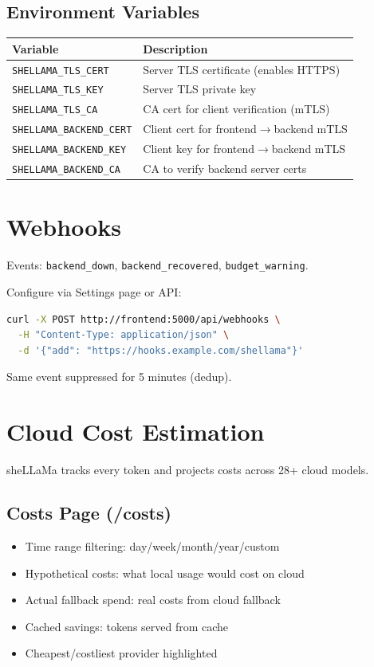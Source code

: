 \documentclass[11pt,a4paper]{article}
\begin{document}
\subsection{Environment Variables}
\begin{longtable}{p{5cm}p{8.5cm}}
\toprule
\textbf{Variable} & \textbf{Description} \\
\midrule
\texttt{SHELLAMA\_TLS\_CERT} & Server TLS certificate (enables HTTPS) \\
\texttt{SHELLAMA\_TLS\_KEY} & Server TLS private key \\
\texttt{SHELLAMA\_TLS\_CA} & CA cert for client verification (mTLS) \\
\texttt{SHELLAMA\_BACKEND\_CERT} & Client cert for frontend$\rightarrow$backend mTLS \\
\texttt{SHELLAMA\_BACKEND\_KEY} & Client key for frontend$\rightarrow$backend mTLS \\
\texttt{SHELLAMA\_BACKEND\_CA} & CA to verify backend server certs \\
\bottomrule
\end{longtable}

\section{Webhooks}

Events: \texttt{backend\_down}, \texttt{backend\_recovered}, \texttt{budget\_warning}.

Configure via Settings page or API:
\begin{lstlisting}[language=bash]
curl -X POST http://frontend:5000/api/webhooks \
  -H "Content-Type: application/json" \
  -d '{"add": "https://hooks.example.com/shellama"}'
\end{lstlisting}

Same event suppressed for 5 minutes (dedup).

\section{Cloud Cost Estimation}

sheLLaMa tracks every token and projects costs across 28+ cloud models.

\subsection{Costs Page (/costs)}
\begin{itemize}
  \item Time range filtering: day/week/month/year/custom
  \item Hypothetical costs: what local usage would cost on cloud
  \item Actual fallback spend: real costs from cloud fallback
  \item Cached savings: tokens served from cache
  \item Cheapest/costliest provider highlighted
\end{itemize}
\end{document}
